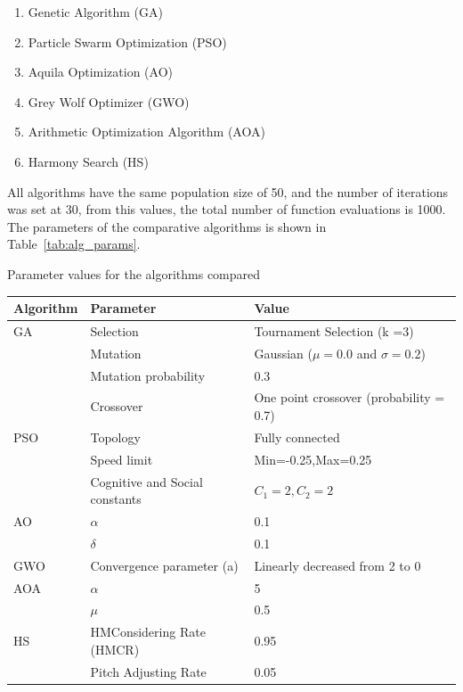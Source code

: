 \documentclass[symmetry,article,submit,moreauthors,pdftex]{Definitions/mdpi}
\begin{document}
\begin{enumerate}
    \item Genetic Algorithm (GA) \cite{holland1992genetic} 
    \item Particle Swarm Optimization (PSO) \cite{kennedy2006swarm} 
    \item Aquila Optimization (AO) \cite{abualigah2021aquila} 
    \item Grey Wolf Optimizer (GWO) \cite{mirjalili2014grey} 
    \item Arithmetic Optimization Algorithm (AOA) \cite{abualigah2021arithmetic} 
    \item Harmony Search (HS) \cite{geem2001new} 
\end{enumerate}

All algorithms have the same population size of 50, and the number of iterations 
was set at 30, from this values, the total number of function evaluations is 1000. 
The parameters of the comparative algorithms is shown in Table~\ref{tab:alg_params}.

\begin{specialtable}[H] 
\small
\caption{Parameter values for the algorithms compared}\label{tab:alg_params}
\begin{tabular}{lll}
\toprule
\textbf{Algorithm} & \textbf{Parameter}	& \textbf{Value}\\
\midrule
GA & Selection & Tournament Selection (k =3)  \\
& Mutation  & Gaussian ($\mu=0.0$ and $\sigma=0.2$)  \\
& Mutation probability  &  0.3 \\
& Crossover  & One point crossover (probability = 0.7)   \\
\midrule
PSO & Topology & Fully connected  \\
& Speed limit& Min=-0.25,Max=0.25   \\
& Cognitive and Social constants & $C_1=2,C_2=2$   \\
\midrule
AO & $\alpha$ & 0.1  \\
& $\delta$ & 0.1  \\
\midrule
GWO & Convergence parameter (a)& Linearly decreased from 2 to 0  \\
\midrule
AOA & $\alpha$ & 5  \\
& $\mu$ & 0.5  \\
\midrule
HS & HMConsidering Rate (HMCR) & 0.95  \\
& Pitch Adjusting Rate & 0.05  \\
\bottomrule
\end{tabular}
\end{specialtable}
\end{document}
